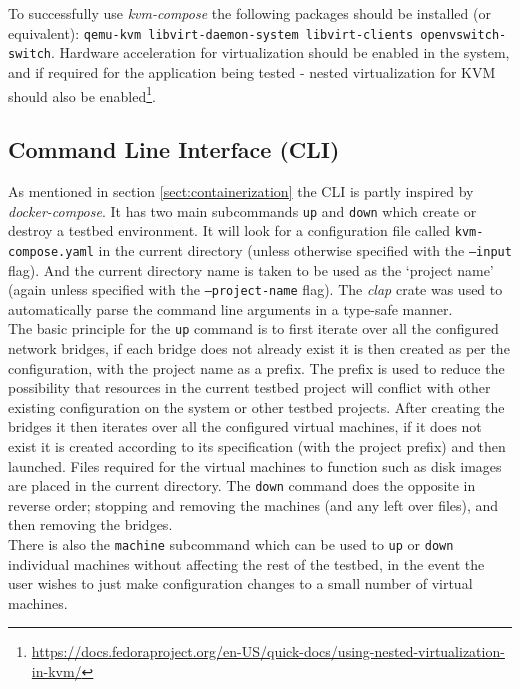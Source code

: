 \documentclass[
    author={Jacob Daniel Halsey},
    supervisor={Prof. Awais Rashid},
    degree={BSc},
    title={Building a Testbed for Evaluating Privacy Enhancing Technologies  (PETs)},
    subtitle={},
    type={software development},
    year={2021}
]{dissertation}
\begin{document}
To successfully use \emph{kvm-compose} the following packages should be installed (or equivalent):
\texttt{qemu-kvm libvirt-daemon-system libvirt-clients openvswitch-switch}. Hardware acceleration
for virtualization should be enabled in the system, and if required for the application being tested - 
nested virtualization for KVM should also be 
enabled\footnote{\url{https://docs.fedoraproject.org/en-US/quick-docs/using-nested-virtualization-in-kvm/}}.

\subsection{Command Line Interface (CLI)}

As mentioned in section \ref{sect:containerization} the CLI is partly inspired by \emph{docker-compose}.
It has two main subcommands \texttt{up} and \texttt{down} which create or destroy a testbed environment.
It will look for a configuration file called \texttt{kvm-compose.yaml} in the current directory (unless
otherwise specified with the \texttt{--input} flag).
And the current directory name is taken to be used as the `project name' (again unless specified with
the \texttt{--project-name} flag). The \emph{clap} crate was used to automatically parse the command line arguments
in a type-safe manner. \\ 

The basic principle for the \texttt{up} command is to first iterate over all the configured network bridges,
if each bridge does not already exist it is then created as per the configuration, with the project name as a prefix.
The prefix is used to reduce the possibility that resources in the current testbed project will conflict
with other existing configuration on the system or other testbed projects. 
After creating the bridges it then iterates over all the configured virtual machines, if it does not exist
it is created according to its specification (with the project prefix) and then launched. 
Files required for the virtual machines to function such as disk images are placed in the current directory.
The \texttt{down} command does the opposite in reverse order;
stopping and removing the machines (and any left over files), and then removing the bridges. \\

There is also the \texttt{machine} subcommand which can be used to \texttt{up} or \texttt{down} individual machines
without affecting the rest of the testbed, in the event the user wishes to just make configuration changes
to a small number of virtual machines.
\end{document}
